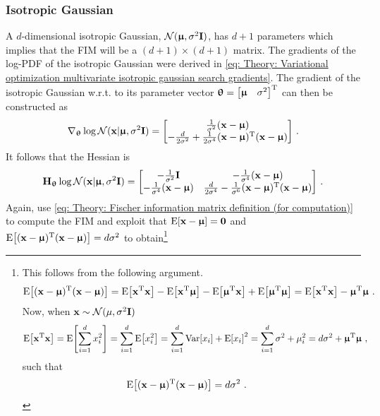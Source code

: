 \subsubsection{Isotropic Gaussian}
A $d$-dimensional isotropic Gaussian, $\mathcal{N}({\boldsymbol{\upmu}},\sigma^2{\mathbf{I}})$, has $d+1$ parameters which implies that the \gls{FIM} will be a $(d+1)\times(d+1)$ matrix. The gradients of the log-\gls{PDF} of the isotropic Gaussian were derived in \eqref{eq: Theory: Variational optimization multivariate isotropic gaussian search gradients}. 
The gradient of the isotropic Gaussian w.r.t. to its parameter vector ${\boldsymbol{\uptheta}}={\begin{bmatrix}{\boldsymbol{\upmu}} & \sigma^2\end{bmatrix}}^\text{T}$ can then be constructed as
\begin{equation}
    \nabla_{\boldsymbol{\uptheta}}\log\mathcal{N}({\mathbf{x}}|{\boldsymbol{\upmu}},\sigma^2{\mathbf{I}}) = {\begin{bmatrix}\frac{1}{\sigma^2}({\mathbf{x}}-{\boldsymbol{\upmu}}) \\ -\frac{d}{2\sigma^2} + \frac{1}{2\sigma^4}({\mathbf{x}}-{\boldsymbol{\upmu}}){^\mathrm{T}}({\mathbf{x}}-{\boldsymbol{\upmu}})\end{bmatrix}} \ .
\end{equation}
It follows that the Hessian is
\begin{equation}
    \H_\thetab\log\mathcal{N}(\x|\mub,\sigma^2\I) = \bmat{-\frac{1}{\sigma^2}\I & -\frac{1}{\sigma^4}(\x-\mub) \\ -\frac{1}{\sigma^4}(\x-\mub) & \frac{d}{2\sigma^4}-\frac{1}{\sigma^6}(\x-\mub)\transpose(\x-\mub)} \ .
\end{equation}
Again, use \eqref{eq: Theory: Fischer information matrix definition (for computation)} to compute the \gls{FIM} and exploit that $\text{E}{\left[{\mathbf{x}}-{\boldsymbol{\upmu}}\right]}={\mathbf{0}}$ and $\text{E}{\left[({\mathbf{x}}-{\boldsymbol{\upmu}}){^\mathrm{T}}({\mathbf{x}}-{\boldsymbol{\upmu}})\right]}=d\sigma^2$ to obtain\footnote{This follows from the following argument.
\begin{align}
    \text{E}{\left[({\mathbf{x}}-{\boldsymbol{\upmu}}){^\mathrm{T}}({\mathbf{x}}-{\boldsymbol{\upmu}})\right]} = \text{E}{\left[{\mathbf{x}}{^\mathrm{T}}{\mathbf{x}}\right]}-\text{E}{\left[{\mathbf{x}}{^\mathrm{T}}{\boldsymbol{\upmu}}\right]}-\text{E}{\left[{\boldsymbol{\upmu}}{^\mathrm{T}}{\mathbf{x}}\right]}+\text{E}{\left[{\boldsymbol{\upmu}}{^\mathrm{T}}{\boldsymbol{\upmu}}\right]}
    = \text{E}{\left[{\mathbf{x}}{^\mathrm{T}}{\mathbf{x}}\right]} - {\boldsymbol{\upmu}}{^\mathrm{T}}{\boldsymbol{\upmu}} \ .\nonumber
\end{align}
Now, when ${\mathbf{x}}\sim\mathcal{N}(\mu,\sigma^2{\mathbf{I}})$
\begin{align}
    \text{E}{\left[{\mathbf{x}}{^\mathrm{T}}{\mathbf{x}}\right]} &= \text{E}{\left[\sum_{i=1}^d x_i^2\right]}
    = \sum_{i=1}^d \text{E}{\left[x_i^2\right]}
    = \sum_{i=1}^d \text{Var}{\left[x_i\right]}+\text{E}{\left[x_i\right]}^2
    = \sum_{i=1}^d \sigma^2+\mu_i^2
    = d\sigma^2+{\boldsymbol{\upmu}}{^\mathrm{T}}{\boldsymbol{\upmu}}\nonumber \ ,
\end{align}
such that
\begin{align}
    \text{E}{\left[({\mathbf{x}}-{\boldsymbol{\upmu}}){^\mathrm{T}}({\mathbf{x}}-{\boldsymbol{\upmu}})\right]} &= d\sigma^2\nonumber \ .
\end{align}
}
